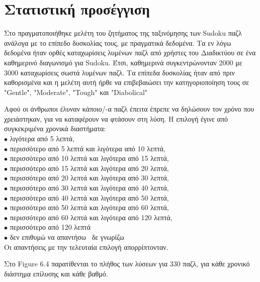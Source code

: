 \documentclass[oneside,12pt]{book}
\theoremstyle{definition}
\begin{document}
\section{Στατιστική προσέγγιση}

Στο \cite{9} πραγματοποιήθηκε μελέτη του ζητήματος της ταξινόμησης των Sudoku παζλ ανάλογα με το επίπεδο δυσκολίας τους, με πραγματικά δεδομένα. Τα εν λόγω δεδομένα ήταν ορθές καταχωρίσεις λυμένων παζλ από χρήστες του Διαδικτύου σε ένα καθημερινό διαγωνισμό για Sudoku. Έτσι, καθημερινά συγκεντρώνονταν 2000 με 3000 καταχωρίσεις σωστά λυμένων παζλ. Τα επίπεδα δυσκολίας ήταν από πριν καθορισμένα και η μελέτη αυτή ήρθε να επιβεβαιώσει την κατηγοριοποίηση τους σε "Gentle", "Moderate", "Tough" και "Diabolical" \par

Αφού οι άνθρωποι έλυναν κάποιο/-α παζλ έπειτα έπρεπε να δηλώσουν τον χρόνο που χρειάστηκαν, για να καταφέρουν να φτάσουν στη λύση. Η επιλογή έγινε από συγκεκριμένα χρονικά διαστήματα: \\
\(\bullet\) λιγότερα από 5 λεπτά, \\
\(\bullet\) περισσότερο από 5 λεπτά και λιγότερα από 10 λεπτά, \\
\(\bullet\) περισσότερο από 10 λεπτά και λιγότερα από 15 λεπτά, \\
\(\bullet\) περισσότερο από 15 λεπτά και λιγότερα από 20 λεπτά, \\
\(\bullet\) περισσότερο από 20 λεπτά και λιγότερα από 30 λεπτά, \\
\(\bullet\) περισσότερο από 30 λεπτά και λιγότερα από 40 λεπτά, \\
\(\bullet\) περισσότερο από 40 λεπτά και λιγότερα από 50 λεπτά, \\
\(\bullet\) περισσότερο από 50 λεπτά και λιγότερα από 60 λεπτά, \\
\(\bullet\) περισσότερο από 60 λεπτά και λιγότερα από 120 λεπτά, \\
\(\bullet\) περισσότερο από 120 λεπτά \\
\(\bullet\) δεν επιθυμώ να απαντήσω \ δε γνωρίζω \\

Οι απαντήσεις με την τελευταία επιλογή απορρίπτονταν.  \par

Στο Figure 6.4 παρατίθενται το πλήθος των λύσεων για 330 παζλ, για κάθε χρονικό διάστημα επίλυσης και κάθε βαθμό.
\end{document}
